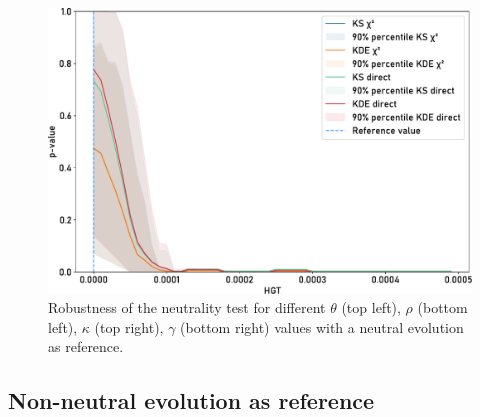 \begin{figure}[]
\begin{minipage}{0.49\textwidth}
        \includegraphics[width=\textwidth]{figures/neutrality_test/gc_0_hgt.pdf}
    \end{minipage}
    \caption[Robustness of the neutrality test for $\kappa = 0$.]{Robustness of the neutrality test for different $\theta$ (top left), $\rho$ (bottom left), $\kappa$ (top right), $\gamma$ (bottom right) values
        with a neutral evolution as reference.}
    \label{fig:robust_gc0}
\end{figure}

\subsection{Non-neutral evolution as reference}

